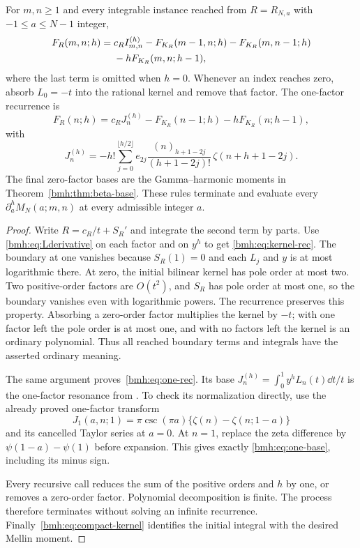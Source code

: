 \begin{theorem}\label{bmh:thm:kernel}
For $m,n\ge1$ and every integrable instance reached from
$R=R_{N,a}$ with $-1\le a\le N-1$ integer,
\begin{align}
 F_R(m,n;h)={}&c_R I_{m,n}^{(h)}
 -F_{K_R}(m-1,n;h)-F_{K_R}(m,n-1;h)\notag\\
 &-hF_{K_R}(m,n;h-1),\label{bmh:eq:kernel-rec}
\end{align}
where the last term is omitted when $h=0$. Whenever an index reaches
zero, absorb $L_0=-t$ into the rational kernel and remove that factor.
The one-factor recurrence is
\begin{equation}\label{bmh:eq:one-rec}
 F_R(n;h)=c_R J_n^{(h)}-F_{K_R}(n-1;h)-hF_{K_R}(n;h-1),
\end{equation}
with
\begin{equation}\label{bmh:eq:one-base}
 J_n^{(h)}=-h!\sum_{j=0}^{\lfloor h/2\rfloor}
 e_{2j}\frac{(n)_{h+1-2j}}{(h+1-2j)!}\,
            \zeta(n+h+1-2j).
\end{equation}
The final zero-factor bases are the Gamma--harmonic moments in
Theorem~\ref{bmh:thm:beta-base}. These rules terminate and evaluate every
$\partial_a^h M_N(a;m,n)$ at every admissible integer $a$.
\end{theorem}
\begin{proof}
Write $R=c_R/t+S_R'$ and integrate the second term by parts. Use
\eqref{bmh:eq:Lderivative} on each factor and on $y^h$ to get
\eqref{bmh:eq:kernel-rec}. The boundary at one vanishes because
$S_R(1)=0$ and each $L_j$ and $y$ is at most logarithmic there. At zero,
the initial bilinear kernel has pole order at most two. Two positive-order
factors are $O(t^2)$, and $S_R$ has pole order at most one, so the boundary
vanishes even with logarithmic powers. The recurrence preserves this
property. Absorbing a zero-order factor multiplies the kernel by $-t$;
with one factor left the pole order is at most one, and with no factors
left the kernel is an ordinary polynomial. Thus all reached boundary
terms and integrals have the asserted ordinary meaning.

The same argument proves~\eqref{bmh:eq:one-rec}. Its base
$J_n^{(h)}=\int_0^1y^hL_n(t)\dd t/t$ is the one-factor resonance from
\cite{MLD}. To check its normalization directly, use the already proved
one-factor transform
\[
 J_1(a,n;1)=\pi\csc(\pi a)\{\zeta(n)-\zeta(n;1-a)\}
\]
and its cancelled Taylor series at $a=0$. At $n=1$, replace the zeta
difference by $\psi(1-a)-\psi(1)$ before expansion. This gives exactly
\eqref{bmh:eq:one-base}, including its minus sign.

Every recursive call reduces the sum of the positive orders and $h$ by
one, or removes a zero-order factor. Polynomial decomposition is finite.
The process therefore terminates without solving an infinite recurrence.
Finally~\eqref{bmh:eq:compact-kernel} identifies the initial integral
with the desired Mellin moment.
\end{proof}

